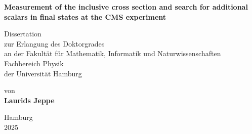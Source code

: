 
\thispagestyle{empty}
\onehalfspacing

\begin{titlepage}
\begin{center}
  \vspace*{0cm}

  \LARGE %
  \bfseries 
    Measurement of the inclusive \ttbar cross section and search for additional scalars in \ttbar final states at the CMS experiment

  \vspace{4cm}

  \normalfont
  \LARGE
    Dissertation\\

  \vspace{1cm}
  \normalfont
  \normalsize
    zur Erlangung des Doktorgrades \\
    an der Fakult{\"a}t f{\"u}r Mathematik, Informatik und Naturwissenschaften\\
    Fachbereich Physik\\
    der Universität Hamburg

 
  \vspace{1cm}
    von\\
  \bfseries 
  \large
   Laurids Jeppe

  \normalfont
  \large
  \vspace{3cm}
  Hamburg\\
  2025
\end{center}
\end{titlepage}


